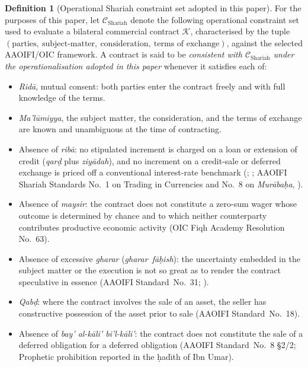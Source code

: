 \documentclass[preprint,12pt,authoryear]{elsarticle}
\newcommand{\CC}{\mathcal{C}}
\theoremstyle{definition}
\newtheorem{definition}{Definition}[section]
\begin{document}
\begin{definition}[Operational Shariah constraint set adopted in
    this paper]
\label{def:shariah-valid}
For the purposes of this paper, let $\CC_{\text{Shariah}}$
denote the following operational constraint set used to
evaluate a bilateral commercial contract $\mathcal{K}$,
characterised by the tuple
$(\text{parties},\ \text{subject-matter},\ \text{consideration},\
  \text{terms of exchange})$, against the selected AAOIFI/OIC
framework. A contract is said to be \emph{consistent with
$\CC_{\text{Shariah}}$ under the operationalisation adopted in
this paper} whenever it satisfies each of:
\begin{itemize}
    \item[(C1)] \emph{Rid\={a}}, mutual consent: both parties
    enter the contract freely and with full knowledge of the terms.
    \item[(C2)] \emph{Ma'l\={u}miyya}, the subject matter, the
    consideration, and the terms of exchange are known and
    unambiguous at the time of contracting.
    \item[(C3)] Absence of \emph{rib\={a}}: no stipulated
    increment is charged on a loan or extension of credit
    (\emph{qar\d{d}} plus \emph{ziy\={a}dah}), and no
    increment on a credit-sale or deferred exchange is priced
    off a conventional interest-rate benchmark (\citealp{Usmani2002};
    \citealp{Kamali2000}; AAOIFI Shariah Standards No.~1 on
    Trading in Currencies and No.~8 on \emph{Mur\={a}ba\d{h}a},
    \citealp{AAOIFI2015}).
    \item[(C4)] Absence of \emph{maysir}: the contract does not
    constitute a zero-sum wager whose outcome is determined by
    chance and to which neither counterparty contributes productive
    economic activity (OIC Fiqh Academy Resolution No.~63).
    \item[(C5)] Absence of excessive \emph{gharar}
    (\emph{gharar~f\={a}\d{h}ish}): the uncertainty embedded in the
    subject matter or the execution is not so great as to render
    the contract speculative in essence (AAOIFI Standard~No.~31;
    \citealp{Kamali2000}).
    \item[(C6)] \emph{Qab\d{d}}: where the contract involves the
    sale of an asset, the seller has constructive possession of
    the asset prior to sale (AAOIFI Standard~No.~18).
    \item[(C7)] Absence of \emph{bay' al-k\={a}li' bi'l-k\={a}li'}:
    the contract does not constitute the sale of a deferred
    obligation for a deferred obligation (AAOIFI Standard~No.~8
    \S2/2; Prophetic prohibition reported in the
    \d{h}ad\={\i}th of Ibn Umar).
\end{itemize}
\end{definition}
\end{document}
